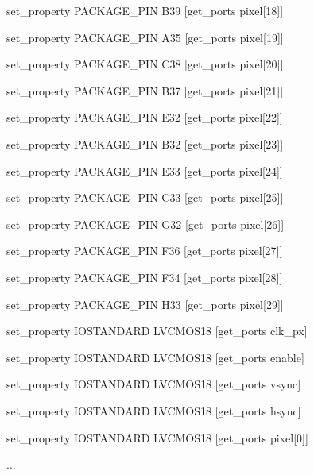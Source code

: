 {set\_property PACKAGE\_PIN B39 [get\_ports {pixel[18]}]

set\_property PACKAGE\_PIN A35 [get\_ports {pixel[19]}]

set\_property PACKAGE\_PIN C38 [get\_ports {pixel[20]}]

set\_property PACKAGE\_PIN B37 [get\_ports {pixel[21]}]

set\_property PACKAGE\_PIN E32 [get\_ports {pixel[22]}]

set\_property PACKAGE\_PIN B32 [get\_ports {pixel[23]}]

set\_property PACKAGE\_PIN E33 [get\_ports {pixel[24]}]

set\_property PACKAGE\_PIN C33 [get\_ports {pixel[25]}]

set\_property PACKAGE\_PIN G32 [get\_ports {pixel[26]}]

set\_property PACKAGE\_PIN F36 [get\_ports {pixel[27]}]

set\_property PACKAGE\_PIN F34 [get\_ports {pixel[28]}]

set\_property PACKAGE\_PIN H33 [get\_ports {pixel[29]}]

set\_property IOSTANDARD LVCMOS18 [get\_ports clk\_px]

set\_property IOSTANDARD LVCMOS18 [get\_ports enable]

set\_property IOSTANDARD LVCMOS18 [get\_ports vsync]

set\_property IOSTANDARD LVCMOS18 [get\_ports hsync]

set\_property IOSTANDARD LVCMOS18 [get\_ports {pixel[0]}]

...

}
